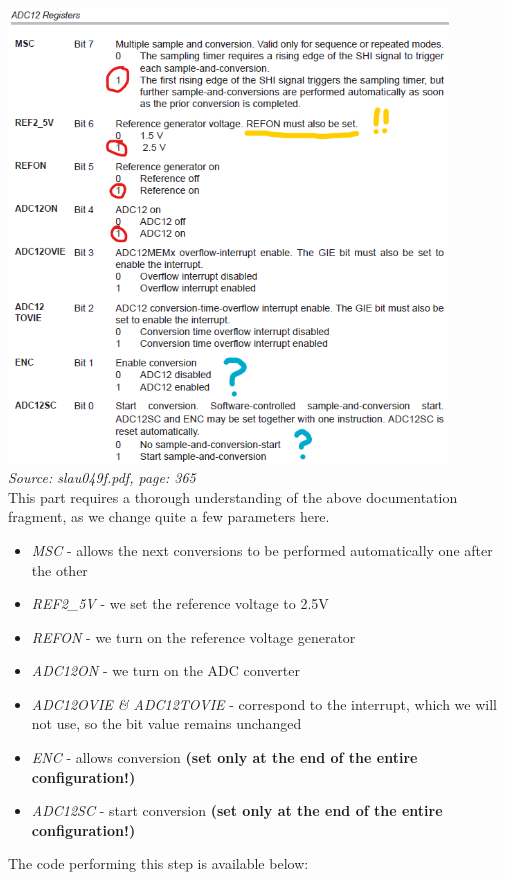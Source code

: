 \documentclass{article}
\begin{document}
\begin{enumerate}[label=\arabic*.]
\includegraphics[width=0.875\textwidth]{"../img/slau049f_365.png"} \\
\textit{Source: slau049f.pdf, page: 365}
\vspace{3mm} \\
This part requires a thorough understanding of the above documentation fragment, as we change quite a few parameters here.
\begin{itemize}
     \item \textit{MSC} - allows the next conversions to be performed automatically one after the other
     \item \textit{REF2\_5V} - we set the reference voltage to 2.5V
     \item \textit{REFON} - we turn on the reference voltage generator
     \item \textit{ADC12ON} - we turn on the ADC converter
     \item \textit{ADC12OVIE \& ADC12TOVIE} - correspond to the interrupt, which we will not use, so the bit value remains unchanged
     \item \textit{ENC} - allows conversion \textbf{(set only at the end of the entire configuration!)}
     \item \textit{ADC12SC} - start conversion \textbf{(set only at the end of the entire configuration!)}
\end{itemize}
The code performing this step is available below:
\begin{verbatim}

\end{verbatim}
\end{enumerate}
\end{document}
